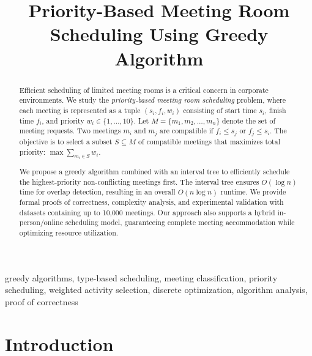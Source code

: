 \documentclass[conference]{IEEEtran}
\begin{document}
\title{Priority-Based Meeting Room Scheduling Using Greedy Algorithm}

\author{
}

\maketitle

\begin{abstract}
Efficient scheduling of limited meeting rooms is a critical concern in corporate environments. We study the \textit{priority-based meeting room scheduling} problem, where each meeting is represented as a tuple $(s_i, f_i, w_i)$ consisting of start time $s_i$, finish time $f_i$, and priority $w_i \in \{1, \dots, 10\}$. Let $M = \{m_1, m_2, \dots, m_n\}$ denote the set of meeting requests. Two meetings $m_i$ and $m_j$ are compatible if $f_i \le s_j$ or $f_j \le s_i$. The objective is to select a subset $S \subseteq M$ of compatible meetings that maximizes total priority: $\max \sum_{m_i \in S} w_i$.  

We propose a greedy algorithm combined with an interval tree to efficiently schedule the highest-priority non-conflicting meetings first. The interval tree ensures $O(\log n)$ time for overlap detection, resulting in an overall $O(n \log n)$ runtime. We provide formal proofs of correctness, complexity analysis, and experimental validation with datasets containing up to 10,000 meetings. Our approach also supports a hybrid in-person/online scheduling model, guaranteeing complete meeting accommodation while optimizing resource utilization.
\end{abstract}


\begin{IEEEkeywords}
greedy algorithms, type-based scheduling, meeting classification, priority scheduling, weighted activity selection, discrete optimization, algorithm analysis, proof of correctness
\end{IEEEkeywords}

\section{Introduction}
\end{document}
